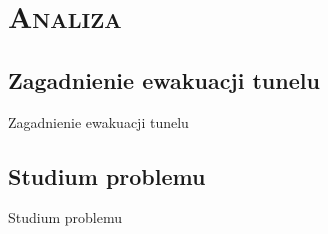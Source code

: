 \section{\scshape Analiza}

\subsection{Zagadnienie ewakuacji tunelu}
\begin{frame}{Zagadnienie ewakuacji tunelu}
\end{frame}

\subsection{Studium problemu}
\begin{frame}{Studium problemu}
\end{frame}